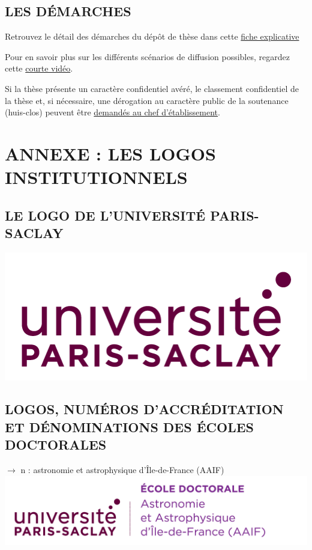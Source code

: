 \documentclass[french,12pt,a4paper]{book}
\begin{document}
\section{LES DÉMARCHES}
Retrouvez le détail des démarches du dépôt de thèse dans cette \href{https://www.universite-paris-saclay.fr/sites/default/files/media/2020-12/fiche_depot_2020_4.pdf}{fiche explicative}\\ \par
Pour en savoir plus sur les différents scénarios de diffusion possibles, regardez cette \href{https://www.youtube.com/watch?v=OK1MFjON5f4}{courte vidéo}.\\ \par
Si la thèse présente un caractère confidentiel avéré, le classement confidentiel de la thèse et, si nécessaire, une dérogation au caractère public de la soutenance (huis-clos) peuvent être \href{https://www.universite-paris-saclay.fr/research/doctorate/quality-assurance-documents/documents-de-reference-relatifs-la-soutenance-de-la-these}{demandés au chef d’établissement}.


\chapter{ANNEXE : LES LOGOS INSTITUTIONNELS}
\section{LE LOGO DE L’UNIVERSITÉ PARIS-SACLAY}
\noindent \includegraphics[scale=0.4]{Logo_ups.png}
\section{LOGOS, NUMÉROS D’ACCRÉDITATION ET DÉNOMINATIONS DES ÉCOLES DOCTORALES}

\noindent \textbf{\color{Prune}$\rightarrow$} n : astronomie et astrophysique d'Île-de-France (AAIF) \\
\includegraphics[scale=.7]{logo_usp_AAIF.png}\\
\end{document}
